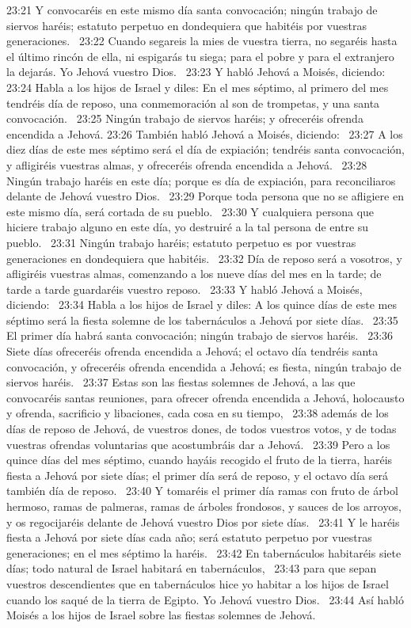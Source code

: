23:21 Y convocaréis en este mismo día santa convocación; ningún trabajo de siervos haréis; estatuto perpetuo en dondequiera que habitéis por vuestras generaciones.  
23:22 Cuando segareis la mies de vuestra tierra, no segaréis hasta el último rincón de ella, ni espigarás tu siega; para el pobre y para el extranjero la dejarás. Yo Jehová vuestro Dios.  
23:23 Y habló Jehová a Moisés, diciendo:  
23:24 Habla a los hijos de Israel y diles: En el mes séptimo, al primero del mes tendréis día de reposo, una conmemoración al son de trompetas, y una santa convocación.  
23:25 Ningún trabajo de siervos haréis; y ofreceréis ofrenda encendida a Jehová. 
23:26 También habló Jehová a Moisés, diciendo:  
23:27 A los diez días de este mes séptimo será el día de expiación; tendréis santa convocación, y afligiréis vuestras almas, y ofreceréis ofrenda encendida a Jehová.  
23:28 Ningún trabajo haréis en este día; porque es día de expiación, para reconciliaros delante de Jehová vuestro Dios.  
23:29 Porque toda persona que no se afligiere en este mismo día, será cortada de su pueblo.  
23:30 Y cualquiera persona que hiciere trabajo alguno en este día, yo destruiré a la tal persona de entre su pueblo.  
23:31 Ningún trabajo haréis; estatuto perpetuo es por vuestras generaciones en dondequiera que habitéis.  
23:32 Día de reposo será a vosotros, y afligiréis vuestras almas, comenzando a los nueve días del mes en la tarde; de tarde a tarde guardaréis vuestro reposo.  
23:33 Y habló Jehová a Moisés, diciendo:  
23:34 Habla a los hijos de Israel y diles: A los quince días de este mes séptimo será la fiesta solemne de los tabernáculos a Jehová por siete días.  
23:35 El primer día habrá santa convocación; ningún trabajo de siervos haréis.  
23:36 Siete días ofreceréis ofrenda encendida a Jehová; el octavo día tendréis santa convocación, y ofreceréis ofrenda encendida a Jehová; es fiesta, ningún trabajo de siervos haréis.  
23:37 Estas son las fiestas solemnes de Jehová, a las que convocaréis santas reuniones, para ofrecer ofrenda encendida a Jehová, holocausto y ofrenda, sacrificio y libaciones, cada cosa en su tiempo,  
23:38 además de los días de reposo de Jehová, de vuestros dones, de todos vuestros votos, y de todas vuestras ofrendas voluntarias que acostumbráis dar a Jehová.  
23:39 Pero a los quince días del mes séptimo, cuando hayáis recogido el fruto de la tierra, haréis fiesta a Jehová por siete días; el primer día será de reposo, y el octavo día será también día de reposo.  
23:40 Y tomaréis el primer día ramas con fruto de árbol hermoso, ramas de palmeras, ramas de árboles frondosos, y sauces de los arroyos, y os regocijaréis delante de Jehová vuestro Dios por siete días.  
23:41 Y le haréis fiesta a Jehová por siete días cada año; será estatuto perpetuo por vuestras generaciones; en el mes séptimo la haréis.  
23:42 En tabernáculos habitaréis siete días; todo natural de Israel habitará en tabernáculos,  
23:43 para que sepan vuestros descendientes que en tabernáculos hice yo habitar a los hijos de Israel cuando los saqué de la tierra de Egipto. Yo Jehová vuestro Dios.  
23:44 Así habló Moisés a los hijos de Israel sobre las fiestas solemnes de Jehová.  
